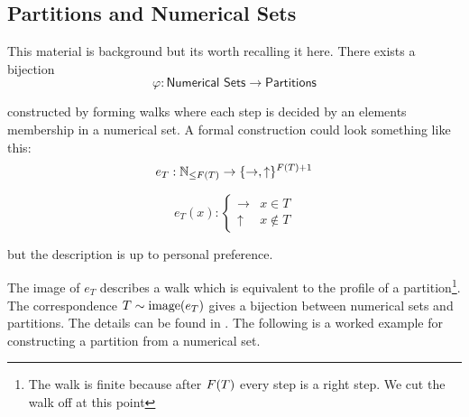 \subsection{Partitions and Numerical Sets}

This material is background but its worth recalling it here. There exists a bijection
\[\varphi: \textsf{Numerical Sets} \to \textsf{Partitions}\]

constructed by forming walks where each step is decided by an elements membership in a numerical set. A formal construction could look something like this:
\[e_T: \mathbb{N}_{\le F(T)} \to \{\rightarrow, \uparrow\}^{F(T) + 1}\]

\[e_T(x): \begin{cases} \rightarrow & x \in T \\ \uparrow & x \not\in T\end{cases}\]

but the description is up to personal preference.

The image of \(e_T\) describes a walk which is equivalent to the profile of a partition\footnote{The walk is finite because after \(F(T)\) every step is a right step. We cut the walk off at this point}. The correspondence \(T \sim \text{image}(e_T)\) gives a bijection between numerical sets and partitions. The details can be found in \cite{Constantin2017}. The following is a worked example for constructing a partition from a numerical set.

